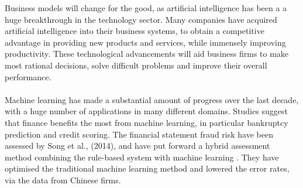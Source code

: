 \documentclass{article}
\begin{document}
Business models will change for the good, as artificial intelligence has been a a huge breakthrough in the technology sector. Many companies have acquired artificial intelligence into their business systems, to obtain a competitive advantage in providing new products and services, while immensely improving productivity. These technological advancements will aid business firms to make most rational decisions, solve difficult problems and improve their overall performance.
\\\\
Machine learning has made a substantial amount of progress over the last decade, with a huge number of applications in many different domains. Studies suggest that finance benefits the most from machine learning, in particular bankruptcy prediction and credit scoring.\cite{000408297900001n.d.} The financial statement fraud risk have been assessed by Song et al., (2014), and have put forward a hybrid assessment method combining the rule-based system with machine learning \cite{song2014application}. They have optimised the traditional machine learning method and lowered the error rates, via the data from Chinese firms.
\end{document}
